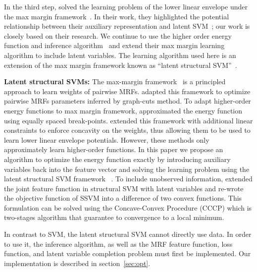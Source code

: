 In the third step,  solved
the learning problem of the lower linear envelope under the max
margin framework~\cite{tsochantaridis2005large}. In their work, 
they highlighted the potential relationship between their
auxiliary representation and latent SVM~\cite{yu2009learning};
our work is closely based on their research. We continue to use
the higher order energy function and inference algorithm~\cite{Gould:ICML2011}
and extend
their max margin learning algorithm to include latent variables.
The learning algorithm used here is an extension of the max margin
framework known as ``latent structural SVM''~\cite{yu2009learning}.

\textbf{Latent structural SVMs:} The max-margin
framework~\cite{Taskar:ICML05,tsochantaridis2005large} is a
principled approach to learn weights of pairwise MRFs.
 adapted this framework to optimize
pairwise MRFs parameters inferred by graph-cuts method.
To adapt higher-order energy functions to max margin
framework,  approximated the energy
function using equally spaced break-points.
 extended this framework with additional
linear constraints to enforce concavity on the weights, thus
allowing them to be used to learn lower linear envelope potentials. However,
these methods only approximately learn higher-order functions. In this paper we 
propose an algorithm to optimize
the energy function exactly by introducing auxiliary variables
back into the feature vector and solving the learning problem
using the latent structural SVM framework
~\cite{yu2009learning}. To include unobserved information,
 extended the joint feature function in
structural SVM with latent variables and re-wrote the objective
function of SSVM into a difference of two convex functions.
This formulation can be solved using the
Concave-Convex Procedure (CCCP)\cite{yuille2002concave} which is
two-stages algorithm that guarantee to convergence to a local
minimum.


In contrast to SVM, the latent structural SVM cannot directly use data. 
In order to use it, the inference algorithm, as
well as the MRF feature function, loss function, and latent
variable completion problem\cite{yu2009learning} must first be
implemented. Our implementation is described in
section~\ref{sec:opt}.

